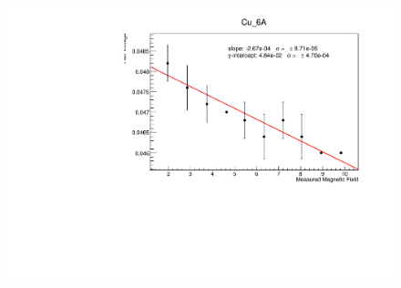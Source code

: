 \documentclass[a4paper,12pt,english]{all-in-one} %
\begin{document}
\begin{figure}[tbh]
    \centering
    \includegraphics[width=0.8\linewidth]{4-hall_effect/overleaf/images/Cu_6A_run1.pdf}
    \caption{ \scriptsize{
    }}
    \label{fig:xray-diagram}
\end{figure}
\end{document}
